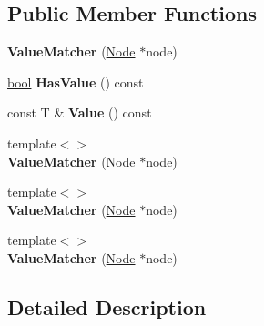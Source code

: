 \subsection*{Public Member Functions}
\begin{DoxyCompactItemize}
\item 
\mbox{\label{structv8_1_1internal_1_1compiler_1_1ValueMatcher_a6a0db84fbfd2acc1a31d5ec40ef1822e}} 
{\bfseries Value\+Matcher} (\mbox{\hyperlink{classv8_1_1internal_1_1compiler_1_1Node}{Node}} $\ast$node)
\item 
\mbox{\label{structv8_1_1internal_1_1compiler_1_1ValueMatcher_a3c20cc942d01ca8a71c7528d05329f68}} 
\mbox{\hyperlink{classbool}{bool}} {\bfseries Has\+Value} () const
\item 
\mbox{\label{structv8_1_1internal_1_1compiler_1_1ValueMatcher_a6d49560818453c65f58c00efe1345cc9}} 
const T \& {\bfseries Value} () const
\item 
\mbox{\label{structv8_1_1internal_1_1compiler_1_1ValueMatcher_a91edd5f603b12427982a51d8632fc72b}} 
{\footnotesize template$<$$>$ }\\{\bfseries Value\+Matcher} (\mbox{\hyperlink{classv8_1_1internal_1_1compiler_1_1Node}{Node}} $\ast$node)
\item 
\mbox{\label{structv8_1_1internal_1_1compiler_1_1ValueMatcher_afe5e51329c1c3b1296ceba069e428373}} 
{\footnotesize template$<$$>$ }\\{\bfseries Value\+Matcher} (\mbox{\hyperlink{classv8_1_1internal_1_1compiler_1_1Node}{Node}} $\ast$node)
\item 
\mbox{\label{structv8_1_1internal_1_1compiler_1_1ValueMatcher_a8e67cd9ffafef34df029113d1d2d8a87}} 
{\footnotesize template$<$$>$ }\\{\bfseries Value\+Matcher} (\mbox{\hyperlink{classv8_1_1internal_1_1compiler_1_1Node}{Node}} $\ast$node)
\end{DoxyCompactItemize}


\subsection{Detailed Description}
